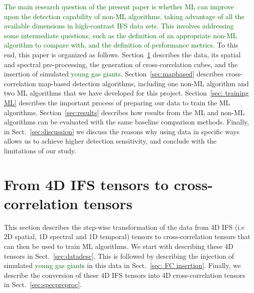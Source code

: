 \documentclass[referee]{aa} %
\newcommand{\newchange}[1]{\textcolor{darkgreen}{#1}}
\begin{document}
\newchange{The main research question of the present paper is whether ML can improve upon the detection capability of non-ML algorithms, taking advantage of all the available dimensions in high-contrast IFS data sets. This involves addressing some intermediate questions, such as the definition of an appropriate non-ML algorithm to compare with, and the definition of performance metrics.}
To this end, this paper is organized as follows. Section~\ref{sec:data} describes the data, its spatial and spectral pre-processing, the generation of cross-correlation cubes, and the insertion of simulated \newchange{young gas giants}.
Section~\ref{sec:mapbased} describes cross-correlation map-based detection algorithms, including one non-ML algorithm and two ML algorithms that we have developed for this project.
Section~\ref{sec: training ML} describes the important process of preparing our data to train the ML algorithms.
Section~\ref{sec:results} describes how results from the ML and non-ML algorithms can be evaluated with the same baseline comparison methods.
Finally, in Sect.~\ref{sec:discussion} we discuss the reasons why using data in specific ways allows us to achieve higher detection sensitivity, and conclude with the limitations of our study.
\section{From 4D IFS tensors to cross-correlation tensors}\label{sec:data}

This section describes the step-wise transformation of the data from 4D IFS (i.e 2D spatial, 1D spectral and 1D temporal) tensors to cross-correlation tensors that can then be used to train ML algorithms.
We start with describing these 4D tensors in Sect.~\ref{sec:datadesc}.
This is followed by describing the injection of simulated \newchange{young gas giant}s in this data in Sect.~\ref{sec: FC insertion}.
Finally, we describe the conversion of these 4D IFS tensors into 4D cross-correlation tensors in Sect.~\ref{sec:specpreproc}.
\end{document}
